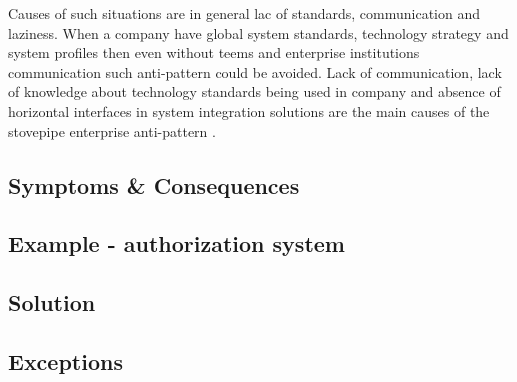 Causes of such situations are in general lac of standards, communication and laziness. When a company have global system standards, technology strategy and system profiles then even without teems and enterprise institutions communication such anti-pattern could be avoided. Lack of communication, lack of knowledge about technology standards being used in company and absence of horizontal interfaces in system integration solutions are the main causes of the stovepipe enterprise anti-pattern \cite{SurvivalGuide}.


\subsection{Symptoms \& Consequences}




\subsection{Example - authorization system}

\subsection{Solution}

\subsection{Exceptions}